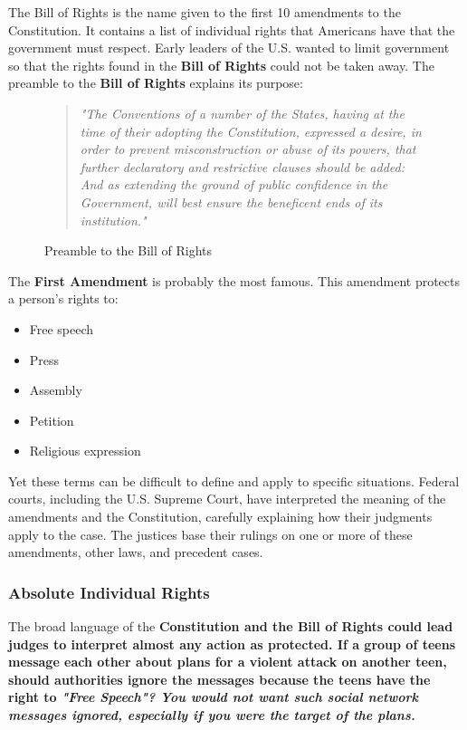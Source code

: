 
The Bill of Rights is the name given to the first 10 amendments to the Constitution. It contains a list of individual rights that Americans have that the government must respect. Early leaders of the U.S. wanted to limit government so that the rights found in the \textbf{Bill of Rights} could not be taken away. The preamble to the \textbf{Bill of Rights} explains its purpose:

\begin{figure}[h]
    \begin{quote}
        \it{"The Conventions of a number of the States, having at the time of their adopting the Constitution, expressed a desire, in order to prevent misconstruction or abuse of its powers, that further declaratory and restrictive clauses should be added: And as extending the ground of public confidence in the Government, will best ensure the beneficent ends of its institution."}
    \end{quote}
    \caption{Preamble to the Bill of Rights}
\end{figure}

The \textbf{First Amendment} is probably the most famous. This amendment protects a person's rights to:

\begin{itemize}
    \item Free speech
    \item Press
    \item Assembly
    \item Petition
    \item Religious expression
\end{itemize}

Yet these terms can be difficult to define and apply to specific situations. Federal courts, including the U.S. Supreme Court, have interpreted the meaning of the amendments and the Constitution, carefully explaining how their judgments apply to the case. The justices base their rulings on one or more of these amendments, other laws, and precedent cases.

\subsubsection*{Absolute Individual Rights}

The broad language of the \bf{Constitution} and the \bf{Bill of Rights} could lead judges to interpret almost any action as protected. If a group of teens message each other about plans for a violent attack on another teen, should authorities ignore the messages because the teens have the right to \it{"Free Speech"}? You would not want such social network messages ignored, especially if you were the target of the plans.

